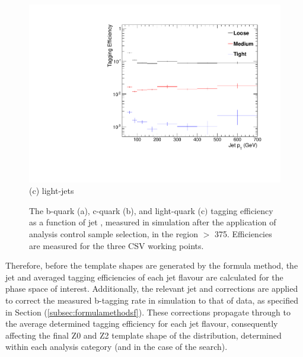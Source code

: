 \begin{figure}[ht]
\begin{minipage}[b]{0.48\linewidth}
\centering
\includegraphics[width = 1.0\linewidth]{plots/lighjet_PtDistribution_Htbin_Template_375.pdf}
\centering (c) light-jets
\end{minipage}
\caption[The b-quark (a), c-quark  (b), and light-quark (c$)$ tagging efficiency as a function of jet \pt, measured in simulation after the application of the \alphat analysis \mupjets control sample selection, in the region \theht $>$ 375.]{The b-quark (a), c-quark  (b), and light-quark (c$)$ tagging efficiency as a function of jet \pt, measured in simulation after the application of \alphat analysis \mupjets control sample selection, in the region \theht $>$ 375. Efficiencies are measured for the three \ac{CSV} working points.}
\label{fig:templatetaggingefficiencies}
\end{figure}
\FloatBarrier

Therefore, before the template shapes are generated by the formula method, the jet \pt and \eta averaged tagging efficiencies of each jet flavour are calculated for the phase space of interest. Additionally, the relevant jet \pt and \eta corrections are applied to correct the measured b-tagging rate in simulation to that of data, as specified in Section (\ref{subsec:formulamethodsf}). These corrections propagate through to the average determined tagging efficiency for each jet flavour, consequently affecting the final Z0 and Z2 template shape of the \nbreco distribution, determined within each analysis category (\theht and \njet in the case of the \alphat search). 


